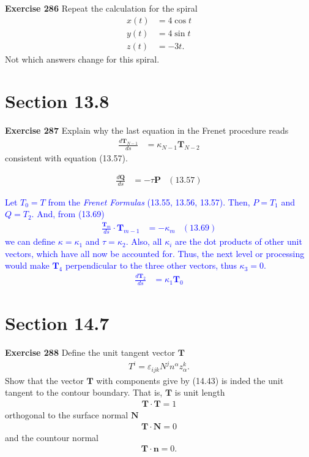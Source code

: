 \documentclass[12pt,a4paper]{report}
\newcommand{\BLUE}[1]{\textcolor{blue}{#1}}
\begin{document}
\begin{description}
\item \textbf{Exercise 286} Repeat the calculation for the spiral
\begin{align*}
	x(t) &= 4\cos t \\
	y(t) &= 4\sin t \\
	z(t) &= -3t.
\end{align*}Not which answers change for this spiral.

\section*{Section 13.8}

\item \textbf{Exercise 287}  Explain why the last equation in the Frenet procedure reads
\begin{align*}
	\frac{d\textbf{T}_{N-1}}{ds} &= \kappa_{N-1}\textbf{T}_{N-2}
\end{align*}consistent with equation (13.57).

\begin{align*}
	\frac{d\textbf{Q}}{ds} &= -\tau\textbf{P} & (13.57)
\end{align*}

\BLUE{Let $T_0 = T$ from the \textit{Frenet Formulas} (13.55, 13.56, 13.57).  Then, $P = T_1$ and $Q = T_2$.  And, from (13.69)
\begin{align*}
	\frac{\textbf{T}_m}{ds}\cdot\textbf{T}_{m-1} &= -\kappa_m & (13.69)
\end{align*}we can define $\kappa = \kappa_1$ and $\tau = \kappa_2$. Also, all $\kappa_i$ are the dot products of other unit vectors, which have all now be accounted for.  Thus, the next level or processing would make $\textbf{T}_4$ perpendicular to the three other vectors, thus $\kappa_3 = 0$.
\begin{align*}
	\frac{d\textbf{T}_2}{ds} &= \kappa_{1}\textbf{T}_0
\end{align*}
}

\section*{Section 14.7}
\item \textbf{Exercise 288}  Define the unit tangent vector $\textbf{T}$
\begin{align*}
	T^i = \varepsilon_{ijk}N^jn^\alpha z^k_\alpha.
\end{align*}
Show that the vector $\textbf{T}$ with components give by (14.43) is inded the unit tangent to the contour boundary.  That is, $\textbf{T}$ is unit length
\begin{align*}
	\textbf{T}\cdot\textbf{T} = 1
\end{align*}orthogonal to the surface normal $\textbf{N}$
\begin{align*}
	\textbf{T}\cdot\textbf{N} = 0
\end{align*}and the countour normal
\begin{align*}
	\textbf{T}\cdot\textbf{n} = 0.
\end{align*}


\end{description}
\end{document}
